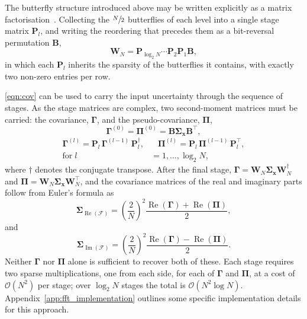 \documentclass[reprint,
               superscriptaddress,
               nobibnotes,
               amsmath,
               amssymb,
               aps,
               hidelinks, 
               pre]{revtex4-2}
\renewcommand{\Re}{\operatorname{Re}}
\renewcommand{\Im}{\operatorname{Im}}
\begin{document}
The butterfly structure introduced above may be written explicitly as a matrix factorisation~\cite{VanLoan1992}. 
Collecting the $\sfrac{N}{2}$ butterflies of each level into a single stage matrix $\mathbf{P}_l$, and writing the reordering that precedes them as a bit-reversal permutation $\mathbf{B}$,
%
\begin{equation}
    \mathbf{W}_N = \mathbf{P}_{\log_2 N} \cdots \mathbf{P}_2
                   \mathbf{P}_1 \mathbf{B},
    \label{eq:ct_factorisation}
\end{equation}
%
in which each $\mathbf{P}_l$ inherits the sparsity of the butterflies it contains, with exactly two non-zero entries per row.

\cref{eqn:cov} can be used to carry the input uncertainty through the sequence of stages. 
As the stage matrices are complex, two second-moment matrices must be carried: the covariance, $\boldsymbol{\Gamma}$, and the pseudo-covariance, $\boldsymbol{\Pi}$, 
%
\begin{equation}
    \boldsymbol{\Gamma}^{(0)} = \boldsymbol{\Pi}^{(0)} = \mathbf{B} \boldsymbol{\Sigma}_{\mathbf{x}} \mathbf{B}^{\top},
    \label{eqn:stagewise2}
\end{equation}
\begin{equation}
    \begin{aligned}
    \boldsymbol{\Gamma}^{(l)} = \mathbf{P}_l \, \boldsymbol{\Gamma}^{(l-1)} \, \mathbf{P}_l^{\dagger}, & \;\;\;
    \boldsymbol{\Pi}^{(l)} = \mathbf{P}_l \, \boldsymbol{\Pi}^{(l-1)} \, \mathbf{P}_l^{\top}, \\
    \textrm{for}\;l & =1,\ldots,\log_2 N,
    \end{aligned}
    \label{eqn:stagewise}
\end{equation}
%
where $\dagger$ denotes the conjugate transpose. 
After the final stage, $\boldsymbol{\Gamma} = \mathbf{W}_N \boldsymbol{\Sigma}_{\mathbf{x}} \mathbf{W}_N^{\dagger}$ and $\boldsymbol{\Pi} = \mathbf{W}_N \boldsymbol{\Sigma}_{\mathbf{x}} \mathbf{W}_N^{\top}$, and the covariance matrices of the real and imaginary parts follow from Euler's formula as
%
\begin{equation}
    \boldsymbol{\Sigma}_{\Re\left(\bm{\mathcal{F}}\right)} = \left(\frac{2}{N}\right)^2 \frac{\Re\left(\boldsymbol{\Gamma}\right) + \Re\left(\boldsymbol{\Pi}\right)}{2},
    \label{eqn:stagewise_reim}
\end{equation}
and
\begin{equation}
    \boldsymbol{\Sigma}_{\Im\left(\bm{\mathcal{F}}\right)} = \left(\frac{2}{N}\right)^2 \frac{\Re\left(\boldsymbol{\Gamma}\right) - \Re\left(\boldsymbol{\Pi}\right)}{2}.
    \label{eqn:stagewise_reim2}
\end{equation}
%
Neither $\boldsymbol{\Gamma}$ nor $\boldsymbol{\Pi}$ alone is sufficient to recover both of these. 
Each stage requires two sparse multiplications, one from each side, for each of $\boldsymbol{\Gamma}$ and $\boldsymbol{\Pi}$, at a cost of $\mathcal{O}\left(N^2\right)$ per stage; over $\log_2 N$ stages the total is $\mathcal{O}\left(N^2 \log N\right)$.
Appendix~\ref{app:fft_implementation} outlines some specific implementation details for this approach.
\end{document}
